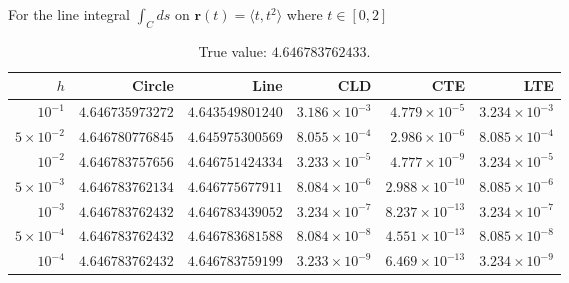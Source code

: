 \documentclass{article}
\begin{document}
\newpage

For the line integral $\int_{C}ds$ on $\mathbf{r}(t)=\langle t, t^2\rangle$ where $t\in[0,2]$
\begin{table}[h]
\centering
\begin{tabular}{rrrrrr}
\hline
$h$ & Circle & Line & CLD & CTE & LTE\\
\hline
$10^{-1}$ & $4.646735973272$ & $4.643549801240$ & $3.186\times10^{-3}$ & $4.779\times10^{-5}$ & $3.234\times10^{-3}$\\
$5\times10^{-2}$ & $4.646780776845$ & $4.645975300569$ & $8.055\times10^{-4}$ & $2.986\times10^{-6}$ & $8.085\times10^{-4}$\\
$10^{-2}$ & $4.646783757656$ & $4.646751424334$ & $3.233\times10^{-5}$ & $4.777\times10^{-9}$ & $3.234\times10^{-5}$\\
$5\times10^{-3}$ & $4.646783762134$ & $4.646775677911$ & $8.084\times10^{-6}$ & $2.988\times10^{-10}$ & $8.085\times10^{-6}$\\
$10^{-3}$ & $4.646783762432$ & $4.646783439052$ & $3.234\times10^{-7}$ & $8.237\times10^{-13}$ & $3.234\times10^{-7}$\\
$5\times10^{-4}$ & $4.646783762432$ & $4.646783681588$ & $8.084\times10^{-8}$ & $4.551\times10^{-13}$ & $8.085\times10^{-8}$\\
$10^{-4}$ & $4.646783762432$ & $4.646783759199$ & $3.233\times10^{-9}$ & $6.469\times10^{-13}$ & $3.234\times10^{-9}$\\
\hline
\end{tabular}
\caption{True value: $4.646783762433$.}
\end{table}
\\
\end{document}
